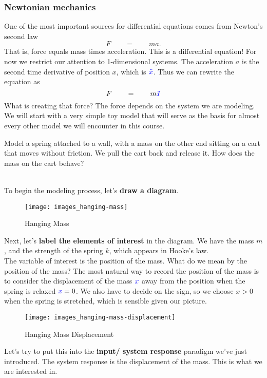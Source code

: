 \subsubsection{Newtonian mechanics}
One of the most important sources for differential equations comes from Newton's second law
\begin{equation*}
  \displaystyle  F \qquad = \qquad ma. 
\end{equation*}
That is, force equals mass times acceleration. This is a differential equation! For now we restrict our attention to 1-dimensional systems.
The acceleration $a$ is the second time derivative of position $x$, which is ${\color{blue} \ddot{x}}$. Thus we can rewrite the equation as
\begin{equation*}
  \displaystyle F \qquad = \qquad m{\color{blue} \ddot{x}}
\end{equation*}
What is creating that force?
The force depends on the system we are modeling.
We will start with a very simple toy model that will serve as the basis for almost every other model we will encounter in this course.
\begin{example}
  Model a spring attached to a wall, with a mass on the other end sitting on a cart that moves without friction.
  We pull the cart back and release it. How does the mass on the cart behave?
\end{example}

\Solution\\
To begin the modeling process, let's \textbf{\color{blue}draw a diagram}.
\begin{figure}[ht!]
  \centering
  \texttt{[image: images\_hanging-mass]}
  \caption{Hanging Mass}
\end{figure}
Next, let's \textbf{\color{blue} label the elements of interest} in the diagram.
We have the mass $m$, and the strength of the spring $k$, which appears in Hooke's law.\\

The variable of interest is the position of the mass.
What do we mean by the position of the mass?
The most natural way to record the position of the mass is to consider the displacement of the mass ${\color{blue} x}$ away from the position when the spring is relaxed ${\color{blue}x}=0$.
We also have to decide on the sign, so we choose $x > 0$ when the spring is stretched,
which is sensible given our picture.
\clearpage
\begin{figure}[ht!]
  \centering
  \texttt{[image: images\_hanging-mass-displacement]}
  \caption{Hanging Mass Displacement}
\end{figure}
Let's try to put this into the \textbf{input/ system response} paradigm we've just introduced.
The system response is the displacement of the mass. This is what we are interested in.\\

